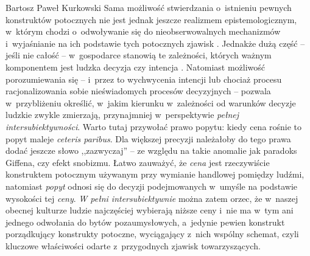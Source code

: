 \begin{artplenv}{Bartosz Paweł Kurkowski}
Sama możliwość stwierdzania o~istnieniu pewnych konstruktów potocznych nie jest jednak jeszcze realizmem
epistemologicznym, w~którym chodzi o~odwoływanie się do nieobserwowalnych mechanizmów i~wyjaśnianie na ich podstawie
tych potocznych zjawisk
\parencite[s.~261]{gorazda_filozofia_2014}.
Jednakże dużą
część -- jeśli nie całość -- w~gospodarce stanowią te zależności, których ważnym komponentem jest ludzka decyzja czy intencja
\parencite[s.~214]{gorazda_filozofia_2014}.
Natomiast możliwość porozumiewania się -- i~przez to wychwycenia
intencji lub chociaż procesu racjonalizowania sobie nieświadomych procesów decyzyjnych -- pozwala w~przybliżeniu
określić, w~jakim kierunku w~zależności od warunków decyzje ludzkie zwykle zmierzają, przynajmniej w~perspektywie
\textit{pełnej intersubiektywności}. Warto tutaj przywołać prawo popytu: kiedy cena rośnie to popyt maleje
\textit{ceteris paribus}. Dla większej precyzji należałoby do tego prawa dodać jeszcze słowo ,,zazwyczaj'' -- ze względu na takie
anomalie jak paradoks Giffena, czy efekt snobizmu. Łatwo zauważyć, że \textit{cena} jest rzeczywiście konstruktem
potocznym używanym przy wymianie handlowej pomiędzy ludźmi, natomiast \textit{popyt }odnosi się do decyzji
podejmowanych w~umyśle na podstawie wysokości tej \textit{ceny}. \textit{W pełni intersubiektywnie }można zatem orzec,
że w~naszej obecnej kulturze ludzie najczęściej wybierają niższe ceny i~nie ma w~tym ani jednego odwołania do bytów
pozaumysłowych, a~jedynie pewien konstrukt porządkujący konstrukty potoczne, wyciągający z~nich wspólny schemat, czyli
kluczowe właściwości odarte z~przygodnych zjawisk towarzyszących.



\end{artplenv}
